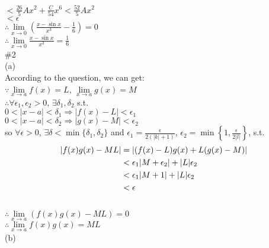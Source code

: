 \documentclass{article}
\begin{document}
\qquad\quad\quad\qquad\quad$<\frac{26}{5}Ax^2+\frac{C}{54}x^6<\frac{52}{5}Ax^2$\\

\qquad\quad\quad\qquad\quad$<\epsilon$\\

$\therefore$\qquad$\lim \limits_{x \to 0}\left(\displaystyle\frac{x-\sin{x}}{x^3}-\frac{1}{6}\right)=0$\\

$\therefore$\qquad$\lim \limits_{x \to 0}\displaystyle\frac{x-\sin{x}}{x^3}=\frac{1}{6}$\\

\textcolor[rgb]{0.00,0.00,0.50}{\#2}\\

(a)\\

According to the question, we can get:\\

$\because$\qquad$\lim \limits_{x \to a}f(x)=L$, $\lim \limits_{x \to a}g(x)=M$\\

$\therefore$\qquad$\forall\epsilon_1,\epsilon_2>0$, $\exists\delta_1,\delta_2$ s.t.\\

\qquad\quad$0<|x-a|<\delta_1 \Rightarrow |f(x)-L|<\epsilon_1$\\

\qquad\quad$0<|x-a|<\delta_2 \Rightarrow |g(x)-M|<\epsilon_2$\\

so $\forall\epsilon>0$, $\exists\delta<\min\{\delta_1,\delta_2\}$ and $\epsilon_1=\displaystyle\frac{\epsilon}{2(|k|+1)}$, $\epsilon_2=\min\left\{1,\displaystyle\frac{\epsilon}{2|l|}\right\}$, s.t.
\begin{align}
|f(x)g(x)-ML|&=|(f(x)-L)g(x)+L(g(x)-M)|\notag\\
&<\epsilon_1|M+\epsilon_2|+|L|\epsilon_2\notag\\
&<\epsilon_1|M+1|+|L|\epsilon_2\notag\\
&<\epsilon\notag
\end{align}\\

$\therefore$\qquad$\lim \limits_{x \to a}\left(f(x)g(x)-ML\right)=0$\\

$\therefore$\qquad$\lim \limits_{x \to a}f(x)g(x)=ML$\\

(b)\\
\end{document}
